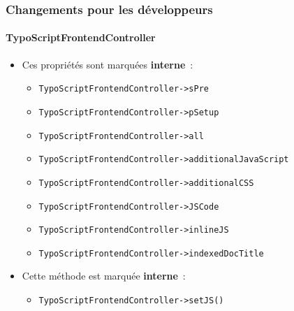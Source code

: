\begin{frame}[fragile]
	\frametitle{Changements pour les développeurs}
	\framesubtitle{TypoScriptFrontendController}

	\begin{itemize}
		\item Ces propriétés sont marquées \textbf{interne}~:
			\begin{itemize}
				\item \texttt{TypoScriptFrontendController->sPre}
				\item \texttt{TypoScriptFrontendController->pSetup}
				\item \texttt{TypoScriptFrontendController->all}
				\item \texttt{TypoScriptFrontendController->additionalJavaScript}
				\item \texttt{TypoScriptFrontendController->additionalCSS}
				\item \texttt{TypoScriptFrontendController->JSCode}
				\item \texttt{TypoScriptFrontendController->inlineJS}
				\item \texttt{TypoScriptFrontendController->indexedDocTitle}
			\end{itemize}

		\item Cette méthode est marquée \textbf{interne}~:

			\begin{itemize}
				\item \texttt{TypoScriptFrontendController->setJS()}
			\end{itemize}

	\end{itemize}

\end{frame}


